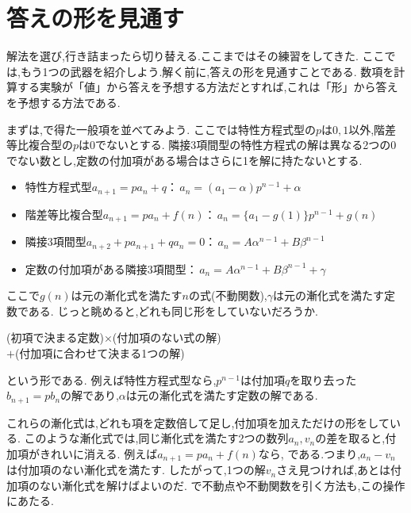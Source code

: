 \section{答えの形を見通す}\label{節：答えの形を見通す}

解法を選び,行き詰まったら切り替える.ここまではその練習をしてきた.
ここでは,もう1つの武器を紹介しよう.解く前に,答えの形を見通すことである.
数項を計算する実験が「値」から答えを予想する方法だとすれば,これは「形」から答えを予想する方法である.

まずは,で得た一般項を並べてみよう.
ここでは特性方程式型の$p$は$0,1$以外,階差等比複合型の$p$は0でないとする.
隣接3項間型の特性方程式の解は異なる2つの0でない数とし,定数の付加項がある場合はさらに1を解に持たないとする.
\begin{itemize}
  \item 特性方程式型$a_{n+1}=pa_n+q$：\,$a_n=(a_1-\alpha)p^{n-1}+\alpha$
  \item 階差等比複合型$a_{n+1}=pa_n+f(n)$：\,$a_n=\{a_1-g(1)\}p^{n-1}+g(n)$
  \item 隣接3項間型$a_{n+2}+pa_{n+1}+qa_n=0$：\,$a_n=A\alpha^{n-1}+B\beta^{n-1}$
  \item 定数の付加項がある隣接3項間型：\,$a_n=A\alpha^{n-1}+B\beta^{n-1}+\gamma$
\end{itemize}
ここで$g(n)$は元の漸化式を満たす$n$の式(不動関数),$\gamma$は元の漸化式を満たす定数である.
じっと眺めると,どれも同じ形をしていないだろうか.
\begin{center}
  (初項で決まる定数)$\times$(付加項のない式の解)\\
  $+$(付加項に合わせて決まる1つの解)
\end{center}
という形である.
例えば特性方程式型なら,$p^{n-1}$は付加項$q$を取り去った$b_{n+1}=pb_n$の解であり,$\alpha$は元の漸化式を満たす定数の解である.

これらの漸化式は,どれも項を定数倍して足し,付加項を加えただけの形をしている.
このような漸化式では,同じ漸化式を満たす2つの数列$a_n,v_n$の差を取ると,付加項がきれいに消える.
例えば$a_{n+1}=pa_n+f(n)$なら,
\BookMathLayout{\[
  \begin{array}{rrl}
    &a_{n+1}={}&pa_n+f(n)\\
    -\,)&v_{n+1}={}&pv_n+f(n)\\ \hline
    &a_{n+1}-v_{n+1}={}&p(a_n-v_n)
  \end{array}
\]}{\[
  \begin{array}{rl}
    &a_{n+1}=pa_n+f(n)\\
    -\,)&v_{n+1}=pv_n+f(n)\\ \hline
    &a_{n+1}-v_{n+1}\\
    &\quad=p(a_n-v_n)
  \end{array}
\]}
である.つまり,$a_n-v_n$は付加項のない漸化式を満たす.
したがって,1つの解$v_n$さえ見つければ,あとは付加項のない漸化式を解けばよいのだ.
で不動点や不動関数を引く方法も,この操作にあたる.

